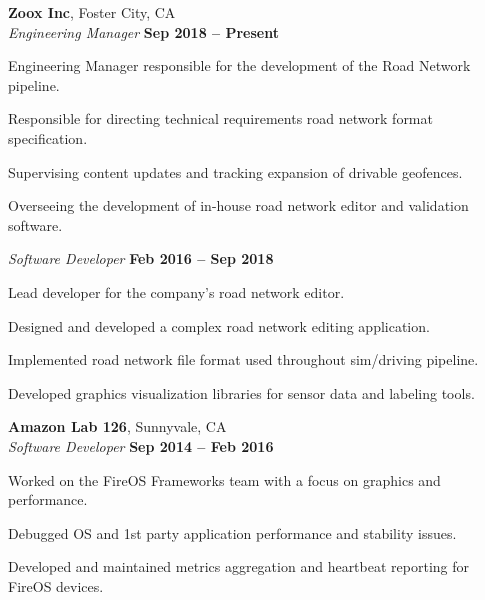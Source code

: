\documentclass[margin,line]{resume}
\begin{document}
\begin{resume}
    \textbf{\listing Zoox Inc}, Foster City, CA \vspace{2mm}\\\vspace{1mm}%
    \textsl{Engineering Manager} \hfill \textbf{Sep 2018 -- Present}\\
    \begin{list2}
        \item Engineering Manager responsible for the development of the Road Network pipeline.
        \item Responsible for directing technical requirements road network format specification.
        \item Supervising content updates and tracking expansion of drivable geofences.
        \item Overseeing the development of in-house road network editor and validation software.
    \end{list2}

    \textsl{Software Developer} \hfill \textbf{Feb 2016 -- Sep 2018}\\
    \begin{list2}
        \item Lead developer for the company's road network editor.
        \item Designed and developed a complex road network editing application.
        \item Implemented road network file format used throughout sim/driving pipeline.
        \item Developed graphics visualization libraries for sensor data and labeling tools.
    \end{list2}

    \textbf{\listing Amazon Lab 126}, Sunnyvale, CA \vspace{2mm}\\\vspace{1mm}%
    \textsl{Software Developer} \hfill \textbf{Sep 2014 -- Feb 2016}\\
    
    \begin{list2}
        \item Worked on the FireOS Frameworks team with a focus on graphics and performance.
        \item Debugged OS and 1st party application performance and stability issues.
        \item Developed and maintained metrics aggregation and heartbeat reporting for FireOS devices.
    \end{list2}


\end{resume}
\end{document}
